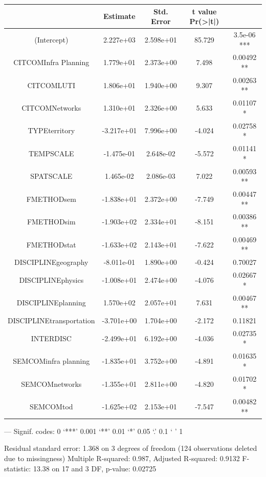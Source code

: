 \begin{tabular}{|c|c|c|c|c|}
\hline
                       &    Estimate & Std. Error & t value Pr(>|t|)    \\\hline
(Intercept)            &   2.227e+03 & 2.598e+01 & 85.729 & 3.5e-06 *** \\
CITCOMInfra Planning   &   1.779e+01 & 2.373e+00  & 7.498 & 0.00492 ** \\
CITCOMLUTI             &   1.806e+01 & 1.940e+00 &  9.307 & 0.00263 ** \\
CITCOMNetworks         &   1.310e+01 & 2.326e+00 &  5.633 & 0.01107 *  \\
TYPEterritory          &  -3.217e+01 & 7.996e+00 & -4.024 & 0.02758 *  \\
TEMPSCALE              &  -1.475e-01 & 2.648e-02 & -5.572 & 0.01141 *  \\
SPATSCALE              &   1.465e-02 & 2.086e-03 &  7.022 & 0.00593 ** \\
FMETHODsem             &  -1.838e+01 & 2.372e+00 & -7.749 & 0.00447 ** \\
FMETHODsim             &  -1.903e+02 & 2.334e+01 & -8.151 & 0.00386 ** \\
FMETHODstat            &  -1.633e+02 & 2.143e+01 & -7.622 & 0.00469 ** \\
DISCIPLINEgeography    &  -8.011e-01 & 1.890e+00 & -0.424 & 0.70027    \\
DISCIPLINEphysics      &  -1.008e+01 & 2.474e+00 & -4.076 & 0.02667 *  \\
DISCIPLINEplanning     &   1.570e+02 & 2.057e+01 &  7.631 & 0.00467 ** \\
DISCIPLINEtransportation & -3.701e+00 & 1.704e+00 & -2.172 & 0.11821    \\
INTERDISC              &  -2.499e+01 & 6.192e+00 & -4.036 & 0.02735 *  \\
SEMCOMinfra planning   &  -1.835e+01 & 3.752e+00 & -4.891 & 0.01635 *  \\
SEMCOMnetworks         &  -1.355e+01 & 2.811e+00 & -4.820 & 0.01702 *  \\
SEMCOMtod              &  -1.625e+02 & 2.153e+01 & -7.547 & 0.00482 ** \\\hline
\end{tabular}

---
Signif. codes:  0 ‘***’ 0.001 ‘**’ 0.01 ‘*’ 0.05 ‘.’ 0.1 ‘ ’ 1

Residual standard error: 1.368 on 3 degrees of freedom
  (124 observations deleted due to missingness)
Multiple R-squared:  0.987,	Adjusted R-squared:  0.9132 
F-statistic: 13.38 on 17 and 3 DF,  p-value: 0.02725









